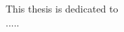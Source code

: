{%
\thispagestyle{empty}%
\begin{vplace}[0.7]
\mbox{}\hfill This thesis is dedicated to \vspace{1pc}\\
\mbox{}\hfill {\large .....}
\end{vplace}%
}
